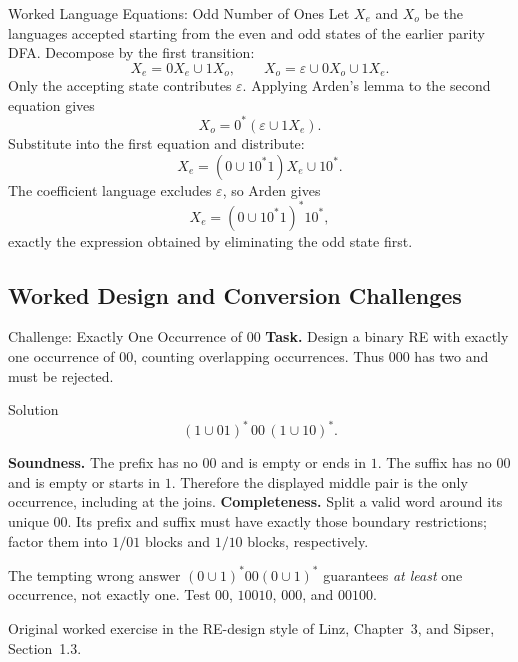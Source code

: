 \documentclass[10pt]{beamer}
\begin{document}
\begin{frame}{Worked Language Equations: Odd Number of Ones}
  \small
  Let $X_e$ and $X_o$ be the languages accepted starting from the even and
  odd states of the earlier parity DFA. Decompose by the first transition:
  \[
    X_e=0X_e\cup1X_o,\qquad
    X_o=\varepsilon\cup0X_o\cup1X_e.
  \]
  Only the accepting state contributes $\varepsilon$.
  \pause
  Applying Arden's lemma to the second equation gives
  \[
    X_o=0^*(\varepsilon\cup1X_e).
  \]
  Substitute into the first equation and distribute:
  \[
    X_e=(0\cup10^*1)X_e\cup10^*.
  \]
  \pause
  The coefficient language excludes $\varepsilon$, so Arden gives
  \[
    X_e=(0\cup10^*1)^*10^*,
  \]
  exactly the expression obtained by eliminating the odd state first.
\end{frame}

\subsection{Worked Design and Conversion Challenges}

\begin{frame}{Challenge: Exactly One Occurrence of 00}
  \small
  \textbf{Task.} Design a binary RE with exactly one occurrence of $00$,
  counting overlapping occurrences. Thus $000$ has two and must be rejected.
  \pause
  \begin{exampleblock}{Solution}
    \[
      (1\cup01)^*\,00\,(1\cup10)^*.
    \]
  \end{exampleblock}
  \textbf{Soundness.} The prefix has no $00$ and is empty or ends in $1$.
  The suffix has no $00$ and is empty or starts in $1$. Therefore the
  displayed middle pair is the only occurrence, including at the joins.
  \pause
  \textbf{Completeness.} Split a valid word around its unique $00$. Its
  prefix and suffix must have exactly those boundary restrictions; factor
  them into $1/01$ blocks and $1/10$ blocks, respectively.
  \begin{alertblock}{The tempting wrong answer}
    $(0\cup1)^*00(0\cup1)^*$ guarantees \emph{at least} one occurrence,
    not exactly one. Test $00$, $10010$, $000$, and $00100$.
  \end{alertblock}
  {\scriptsize Original worked exercise in the RE-design style of Linz,
  Chapter~3, and Sipser, Section~1.3.}
\end{frame}
\end{document}
